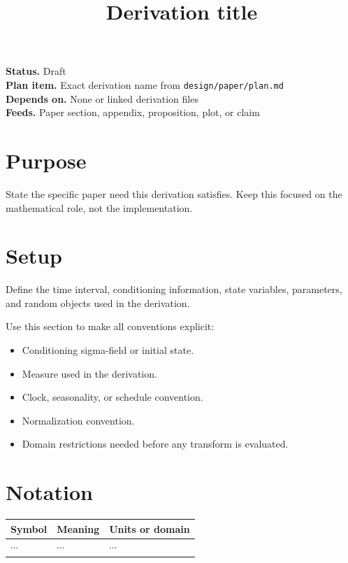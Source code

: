 \documentclass[11pt]{article}
\title{Derivation title}
\author{}
\date{}
\begin{document}
\maketitle

\noindent\textbf{Status.} Draft\\
\textbf{Plan item.} Exact derivation name from \texttt{design/paper/plan.md}\\
\textbf{Depends on.} None or linked derivation files\\
\textbf{Feeds.} Paper section, appendix, proposition, plot, or claim

\section{Purpose}

State the specific paper need this derivation satisfies. Keep this focused on
the mathematical role, not the implementation.

\section{Setup}

Define the time interval, conditioning information, state variables, parameters,
and random objects used in the derivation.

Use this section to make all conventions explicit:
\begin{itemize}
    \item Conditioning sigma-field or initial state.
    \item Measure used in the derivation.
    \item Clock, seasonality, or schedule convention.
    \item Normalization convention.
    \item Domain restrictions needed before any transform is evaluated.
\end{itemize}

\section{Notation}

\begin{tabularx}{\textwidth}{lXX}
\toprule
Symbol & Meaning & Units or domain\\
\midrule
\(\cdots\) & \(\cdots\) & \(\cdots\)\\
\bottomrule
\end{tabularx}
\end{document}
